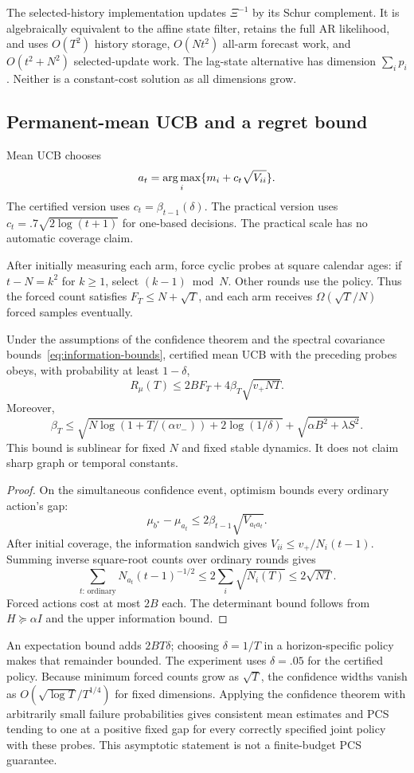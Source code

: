 The selected-history implementation updates $\Xi^{-1}$ by its Schur complement. It is algebraically equivalent to the affine state filter, retains the full AR likelihood, and uses $O(T^2)$ history storage, $O(Nt^2)$ all-arm forecast work, and $O(t^2+N^2)$ selected-update work. The lag-state alternative has dimension $\sum_i p_i$. Neither is a constant-cost solution as all dimensions grow.

\subsection{Permanent-mean UCB and a regret bound}
Mean UCB chooses
\begin{equation}
a_t=\operatorname*{arg\,max}_i\{m_i+c_t\sqrt{V_{ii}}\}.
\label{eq:mean-ucb}
\end{equation}
The certified version uses $c_t=\beta_{t-1}(\delta)$. The practical version uses $c_t=.7\sqrt{2\log(t+1)}$ for one-based decisions. The practical scale has no automatic coverage claim.

After initially measuring each arm, force cyclic probes at square calendar ages: if $t-N=k^2$ for $k\ge1$, select $(k-1)\bmod N$. Other rounds use the policy. Thus the forced count satisfies $F_T\le N+\sqrt T$, and each arm receives $\Omega(\sqrt T/N)$ forced samples eventually.

\begin{theorem}
Under the assumptions of the confidence theorem and the spectral covariance bounds~\eqref{eq:information-bounds}, certified mean UCB with the preceding probes obeys, with probability at least $1-\delta$,
\begin{equation}
\boxed{R_\mu(T)\le 2BF_T+4\beta_T\sqrt{v_+NT}.}
\label{eq:mean-regret-bound}
\end{equation}
Moreover,
\[
\beta_T\le\sqrt{N\log(1+T/(\alpha v_-))+2\log(1/\delta)}
+\sqrt{\alpha B^2+\lambda S^2}.
\]
This bound is sublinear for fixed $N$ and fixed stable dynamics. It does not claim sharp graph or temporal constants.
\end{theorem}
\begin{proof}
On the simultaneous confidence event, optimism bounds every ordinary action's gap:
\[
\mu_{b^*}-\mu_{a_t}\le2\beta_{t-1}\sqrt{V_{a_ta_t}}.
\]
After initial coverage, the information sandwich gives $V_{ii}\le v_+/N_i(t-1)$. Summing inverse square-root counts over ordinary rounds gives
\[
\sum_{t:\,\text{ordinary}}N_{a_t}(t-1)^{-1/2}
\le2\sum_i\sqrt{N_i(T)}\le2\sqrt{NT}.
\]
Forced actions cost at most $2B$ each. The determinant bound follows from $H\succeq\alpha I$ and the upper information bound.
\end{proof}
An expectation bound adds $2BT\delta$; choosing $\delta=1/T$ in a horizon-specific policy makes that remainder bounded. The experiment uses $\delta=.05$ for the certified policy. Because minimum forced counts grow as $\sqrt T$, the confidence widths vanish as $O(\sqrt{\log T}/T^{1/4})$ for fixed dimensions. Applying the confidence theorem with arbitrarily small failure probabilities gives consistent mean estimates and PCS tending to one at a positive fixed gap for every correctly specified joint policy with these probes. This asymptotic statement is not a finite-budget PCS guarantee.
